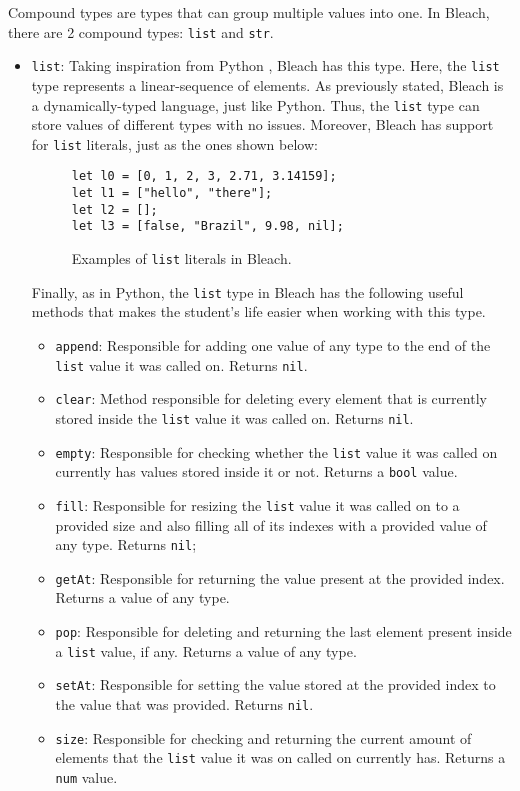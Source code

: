 Compound types are types that can group multiple values into one. In Bleach, there are 2 compound types: \texttt{list} and \texttt{str}.
\begin{itemize}
    \item \texttt{list}: Taking inspiration from Python \cite{python_language}, Bleach has this type. Here, the \texttt{list} type represents a linear-sequence of elements. As previously stated, Bleach is a dynamically-typed language, just like Python. Thus, the \texttt{list} type can store values of different types with no issues. Moreover, Bleach has support for \texttt{list} literals, just as the ones shown below:\newline

    \begin{figure}[H]
        \centering
        \begin{lstlisting}
let l0 = [0, 1, 2, 3, 2.71, 3.14159];
let l1 = ["hello", "there"];
let l2 = [];
let l3 = [false, "Brazil", 9.98, nil];
        \end{lstlisting}
        \caption{Examples of \texttt{list} literals in Bleach.}
    \end{figure}

    Finally, as in Python, the \texttt{list} type in Bleach has the following useful methods that makes the student's life easier when working with this type.
    
    \begin{itemize}
        \item \texttt{append}: Responsible for adding one value of any type to the end of the \texttt{list} value it was called on. Returns \texttt{nil}.
        \item \texttt{clear}: Method responsible for deleting every element that is currently stored inside the \texttt{list} value it was called on. Returns \texttt{nil}.
        \item \texttt{empty}: Responsible for checking whether the \texttt{list} value it was called on currently has values stored inside it or not. Returns a \texttt{bool} value.
        \item \texttt{fill}: Responsible for resizing the \texttt{list} value it was called on to a provided size and also filling all of its indexes with a provided value of any type. Returns \texttt{nil}; 
        \item \texttt{getAt}: Responsible for returning the value present at the provided index. Returns a value of any type.
        \item \texttt{pop}: Responsible for deleting and returning the last element present inside a \texttt{list} value, if any. Returns a value of any type.
        \item \texttt{setAt}: Responsible for setting the value stored at the provided index to the value that was provided. Returns \texttt{nil}.
        \item \texttt{size}: Responsible for checking and returning the current amount of elements that the \texttt{list} value it was on called on currently has. Returns a \texttt{num} value.
    \end{itemize}


\end{itemize}
